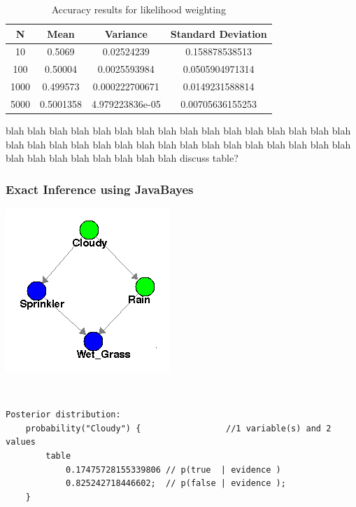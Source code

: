 \documentclass{article}
\begin{document}
\begin{table}[h]
\centering
\begin{tabular}{|c|c|c|c|}
\hline
N    & Mean      & Variance        & Standard Deviation \\ \hline
10   & 0.5069    & 0.02524239      & 0.158878538513     \\ \hline
100  & 0.50004   & 0.0025593984    & 0.0505904971314    \\ \hline
1000 & 0.499573  & 0.000222700671  & 0.0149231588814    \\ \hline
5000 & 0.5001358 & 4.979223836e-05 & 0.00705636155253   \\ \hline
\end{tabular}
\caption {Accuracy results for likelihood weighting}
\end{table}

blah blah blah blah blah blah blah blah blah blah blah blah blah blah blah blah blah blah blah blah blah blah blah blah blah blah blah blah blah blah blah blah blah blah blah blah blah blah blah blah discuss table?

\subsubsection{Exact Inference using JavaBayes}
\begin{minipage}{\linewidth}
\begin{center}
\includegraphics[scale=0.7]{part4_bn}
\end{center}
\end{minipage}\\

\begin{minipage}{\linewidth}
\begin{lstlisting}
Posterior distribution:
	probability("Cloudy") {                 //1 variable(s) and 2 values
		table 
			0.17475728155339806	// p(true  | evidence )
			0.825242718446602; 	// p(false | evidence );
	}
\end{lstlisting}
\end{minipage}\\
\\
\\
\end{document}
